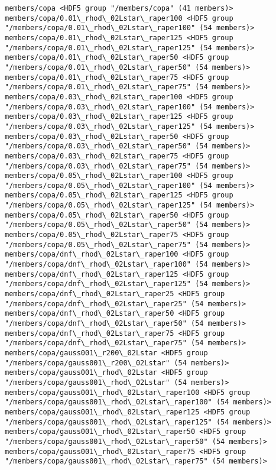 \documentclass[11pt]{article}
\begin{document}
\begin{Verbatim}[commandchars=\\\{\}]
members/copa <HDF5 group "/members/copa" (41 members)>
members/copa/0.01\_rhod\_02Lstar\_raper100 <HDF5 group "/members/copa/0.01\_rhod\_02Lstar\_raper100" (54 members)>
members/copa/0.01\_rhod\_02Lstar\_raper125 <HDF5 group "/members/copa/0.01\_rhod\_02Lstar\_raper125" (54 members)>
members/copa/0.01\_rhod\_02Lstar\_raper50 <HDF5 group "/members/copa/0.01\_rhod\_02Lstar\_raper50" (54 members)>
members/copa/0.01\_rhod\_02Lstar\_raper75 <HDF5 group "/members/copa/0.01\_rhod\_02Lstar\_raper75" (54 members)>
members/copa/0.03\_rhod\_02Lstar\_raper100 <HDF5 group "/members/copa/0.03\_rhod\_02Lstar\_raper100" (54 members)>
members/copa/0.03\_rhod\_02Lstar\_raper125 <HDF5 group "/members/copa/0.03\_rhod\_02Lstar\_raper125" (54 members)>
members/copa/0.03\_rhod\_02Lstar\_raper50 <HDF5 group "/members/copa/0.03\_rhod\_02Lstar\_raper50" (54 members)>
members/copa/0.03\_rhod\_02Lstar\_raper75 <HDF5 group "/members/copa/0.03\_rhod\_02Lstar\_raper75" (54 members)>
members/copa/0.05\_rhod\_02Lstar\_raper100 <HDF5 group "/members/copa/0.05\_rhod\_02Lstar\_raper100" (54 members)>
members/copa/0.05\_rhod\_02Lstar\_raper125 <HDF5 group "/members/copa/0.05\_rhod\_02Lstar\_raper125" (54 members)>
members/copa/0.05\_rhod\_02Lstar\_raper50 <HDF5 group "/members/copa/0.05\_rhod\_02Lstar\_raper50" (54 members)>
members/copa/0.05\_rhod\_02Lstar\_raper75 <HDF5 group "/members/copa/0.05\_rhod\_02Lstar\_raper75" (54 members)>
members/copa/dnf\_rhod\_02Lstar\_raper100 <HDF5 group "/members/copa/dnf\_rhod\_02Lstar\_raper100" (54 members)>
members/copa/dnf\_rhod\_02Lstar\_raper125 <HDF5 group "/members/copa/dnf\_rhod\_02Lstar\_raper125" (54 members)>
members/copa/dnf\_rhod\_02Lstar\_raper25 <HDF5 group "/members/copa/dnf\_rhod\_02Lstar\_raper25" (54 members)>
members/copa/dnf\_rhod\_02Lstar\_raper50 <HDF5 group "/members/copa/dnf\_rhod\_02Lstar\_raper50" (54 members)>
members/copa/dnf\_rhod\_02Lstar\_raper75 <HDF5 group "/members/copa/dnf\_rhod\_02Lstar\_raper75" (54 members)>
members/copa/gauss001\_r200\_02Lstar <HDF5 group "/members/copa/gauss001\_r200\_02Lstar" (54 members)>
members/copa/gauss001\_rhod\_02Lstar <HDF5 group "/members/copa/gauss001\_rhod\_02Lstar" (54 members)>
members/copa/gauss001\_rhod\_02Lstar\_raper100 <HDF5 group "/members/copa/gauss001\_rhod\_02Lstar\_raper100" (54 members)>
members/copa/gauss001\_rhod\_02Lstar\_raper125 <HDF5 group "/members/copa/gauss001\_rhod\_02Lstar\_raper125" (54 members)>
members/copa/gauss001\_rhod\_02Lstar\_raper50 <HDF5 group "/members/copa/gauss001\_rhod\_02Lstar\_raper50" (54 members)>
members/copa/gauss001\_rhod\_02Lstar\_raper75 <HDF5 group "/members/copa/gauss001\_rhod\_02Lstar\_raper75" (54 members)>

\end{Verbatim}
\end{document}
